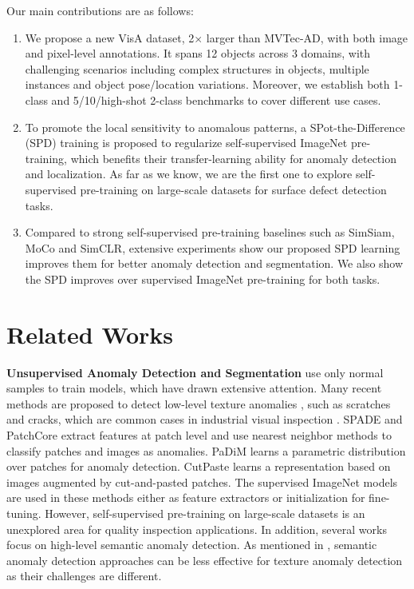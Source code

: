 \documentclass[runningheads]{llncs}
\begin{document}
Our main contributions are as follows:
\begin{enumerate}
    \item We propose a new VisA dataset, 2$\times$ larger than MVTec-AD, with both image and pixel-level annotations. It spans 12 objects across 3 domains, with challenging scenarios including complex structures in objects, multiple instances and object pose/location variations. Moreover, we establish both 1-class and 5/10/high-shot 2-class benchmarks to cover different use cases.
    \item To promote the local sensitivity to anomalous patterns, a SPot-the-Difference (SPD) training is proposed to regularize self-supervised ImageNet pre-training, which benefits their transfer-learning ability for anomaly detection and localization. As far as we know, we are the first one to explore self-supervised pre-training on large-scale datasets for surface defect detection tasks. 
\item Compared to strong self-supervised pre-training baselines such as SimSiam, MoCo and SimCLR, extensive experiments show our proposed SPD learning improves them for better anomaly detection and segmentation. We also show the SPD improves over supervised ImageNet pre-training for both tasks. 
\end{enumerate}
\section{Related Works}
\noindent\textbf{Unsupervised Anomaly Detection and Segmentation} use only normal samples to train models, which have drawn extensive attention. Many recent methods are proposed to detect low-level texture anomalies \cite{ruff2021unifying}, such as scratches and cracks, which are common cases in industrial visual inspection \cite{Deng_2022_CVPR,Ristea-CVPR-2022,RudWeh2022,yi2020patch}. SPADE \cite{defard2021padim} and PatchCore \cite{Roth_2022_CVPR} extract features at patch level and use nearest neighbor methods to classify patches and images as anomalies. PaDiM \cite{defard2021padim} learns a parametric distribution over patches for anomaly detection. CutPaste \cite{li2021cutpaste} learns a representation based on images augmented by cut-and-pasted patches. The supervised ImageNet models are used in these methods either as feature extractors or initialization for fine-tuning. However, self-supervised pre-training on large-scale datasets is an unexplored area for quality inspection applications. In addition, several works \cite{reiss2021mean,sohn2021learning,tack2020csi,pmlr-v80-ruff18a} focus on high-level semantic anomaly detection. As mentioned in \cite{ruff2021unifying}, semantic anomaly detection approaches can be less effective for texture anomaly detection as their challenges are different.
\end{document}
